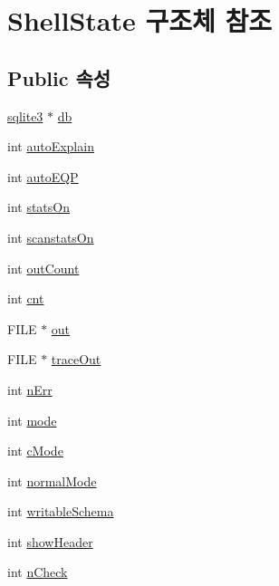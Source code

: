 \hypertarget{struct_shell_state}{}\section{Shell\+State 구조체 참조}
\label{struct_shell_state}
\subsection*{Public 속성}
\begin{DoxyCompactItemize}
\item 
\hyperlink{sqlite3_8h_a0ef6f2646262c8a9b24368d8ac140f69}{sqlite3} $\ast$ \hyperlink{struct_shell_state_aff5184c68cc62f6db1876cc28ffaf7e0}{db}
\item 
int \hyperlink{struct_shell_state_a1ce80144b7c10d594fcd1cbba9b4a874}{auto\+Explain}
\item 
int \hyperlink{struct_shell_state_ab3a2de04a6ec0c08da36f5b2a8870df0}{auto\+E\+QP}
\item 
int \hyperlink{struct_shell_state_a07631569595d0bac838efef39e6e147d}{stats\+On}
\item 
int \hyperlink{struct_shell_state_aac5055c5404f54e65f52dfdab67cc49d}{scanstats\+On}
\item 
int \hyperlink{struct_shell_state_aa3830a7924f73f6ff4eb27fd11ef4a14}{out\+Count}
\item 
int \hyperlink{struct_shell_state_a2ff4d941ad9ef12844aa5281e98ef7c1}{cnt}
\item 
F\+I\+LE $\ast$ \hyperlink{struct_shell_state_afe68611d577c5398d24a790bac1b5e56}{out}
\item 
F\+I\+LE $\ast$ \hyperlink{struct_shell_state_a308c221cb2f11f68231232a18466c94f}{trace\+Out}
\item 
int \hyperlink{struct_shell_state_a014f654813021513e6bf6091926b3877}{n\+Err}
\item 
int \hyperlink{struct_shell_state_a555e4be1ff388f8fb4e71765e4b08ab2}{mode}
\item 
int \hyperlink{struct_shell_state_a85f31fbf107e9127829e4bbbd1a9b675}{c\+Mode}
\item 
int \hyperlink{struct_shell_state_abf9cf08c0a0cd37b43931ed3e6b28e82}{normal\+Mode}
\item 
int \hyperlink{struct_shell_state_a7b6ccf04e4f4174830faf39116ed74f6}{writable\+Schema}
\item 
int \hyperlink{struct_shell_state_adf90aea39543d0b710b7bb6a4d0236e3}{show\+Header}
\item 
int \hyperlink{struct_shell_state_a0afb65c2cd8e373535a1323770db0040}{n\+Check}

\end{DoxyCompactItemize}
